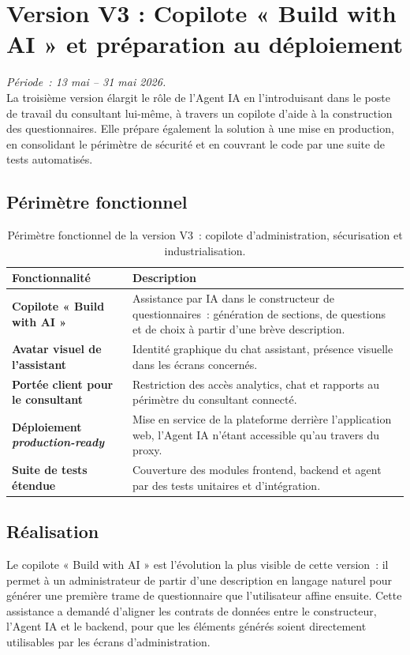 \documentclass[12pt,a4paper]{report}
\begin{document}
\section{Version V3 : Copilote « Build with AI » et préparation au déploiement}
\textit{Période~: 13 mai -- 31 mai 2026.}\\[0.2cm]
La troisième version élargit le rôle de l'Agent IA en l'introduisant dans le poste de travail du consultant lui-même, à travers un copilote d'aide à la construction des questionnaires. Elle prépare également la solution à une mise en production, en consolidant le périmètre de sécurité et en couvrant le code par une suite de tests automatisés.

\subsection*{Périmètre fonctionnel}
\begin{table}[H]
\centering
\caption{Périmètre fonctionnel de la version V3~: copilote d'administration, sécurisation et industrialisation.}
\begin{tabularx}{\textwidth}{>{\bfseries}L{4.6cm}Y}
\toprule
Fonctionnalité & Description \\
\midrule
Copilote « Build with AI » & Assistance par IA dans le constructeur de questionnaires~: génération de sections, de questions et de choix à partir d'une brève description. \\
Avatar visuel de l'assistant & Identité graphique du chat assistant, présence visuelle dans les écrans concernés. \\
Portée client pour le consultant & Restriction des accès analytics, chat et rapports au périmètre du consultant connecté. \\
Déploiement \textit{production-ready} & Mise en service de la plateforme derrière l'application web, l'Agent IA n'étant accessible qu'au travers du proxy. \\
Suite de tests étendue & Couverture des modules frontend, backend et agent par des tests unitaires et d'intégration. \\
\bottomrule
\end{tabularx}
\label{tab:v3}
\end{table}

\subsection*{Réalisation}
Le copilote « Build with AI » est l'évolution la plus visible de cette version~: il permet à un administrateur de partir d'une description en langage naturel pour générer une première trame de questionnaire que l'utilisateur affine ensuite. Cette assistance a demandé d'aligner les contrats de données entre le constructeur, l'Agent IA et le backend, pour que les éléments générés soient directement utilisables par les écrans d'administration.
\end{document}
